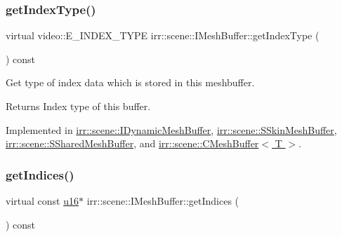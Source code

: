 \mbox{\label{classirr_1_1scene_1_1IMeshBuffer_a8a993431c2c35420b62a577dc18dbdc2}} 
\subsubsection{\texorpdfstring{get\+Index\+Type()}{getIndexType()}}
{\footnotesize\ttfamily virtual video\+::\+E\+\_\+\+I\+N\+D\+E\+X\+\_\+\+T\+Y\+PE irr\+::scene\+::\+I\+Mesh\+Buffer\+::get\+Index\+Type (\begin{DoxyParamCaption}{ }\end{DoxyParamCaption}) const\hspace{0.3cm}{\ttfamily [pure virtual]}}



Get type of index data which is stored in this meshbuffer. 

\begin{DoxyReturn}{Returns}
Index type of this buffer. 
\end{DoxyReturn}


Implemented in \hyperlink{classirr_1_1scene_1_1IDynamicMeshBuffer_a3ac73aed8c40103682c5c6388339e70d}{irr\+::scene\+::\+I\+Dynamic\+Mesh\+Buffer}, \hyperlink{structirr_1_1scene_1_1SSkinMeshBuffer_a0655e2196cb283a164580ada6c34aecf}{irr\+::scene\+::\+S\+Skin\+Mesh\+Buffer}, \hyperlink{structirr_1_1scene_1_1SSharedMeshBuffer_af9d02a1f61c5498cbe21be8185d1c803}{irr\+::scene\+::\+S\+Shared\+Mesh\+Buffer}, and \hyperlink{classirr_1_1scene_1_1CMeshBuffer_aa183491690fa47b4697bbfcc7902301c}{irr\+::scene\+::\+C\+Mesh\+Buffer$<$ T $>$}.

\mbox{\label{classirr_1_1scene_1_1IMeshBuffer_a76c0013378012af7aeb6cb8f4ea8f9a1}} 
\subsubsection{\texorpdfstring{get\+Indices()}{getIndices()}\hspace{0.1cm}{\footnotesize\ttfamily [1/2]}}
{\footnotesize\ttfamily virtual const \hyperlink{namespaceirr_ae9f8ec82692ad3b83c21f555bfa70bcc}{u16}$\ast$ irr\+::scene\+::\+I\+Mesh\+Buffer\+::get\+Indices (\begin{DoxyParamCaption}{ }\end{DoxyParamCaption}) const\hspace{0.3cm}{\ttfamily [pure virtual]}}



